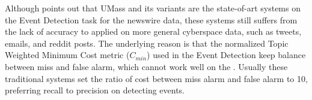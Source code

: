 \documentclass[conference,compsoc]{IEEEtran}
\begin{document}
Although \cite{Wurzer:2015wq} points out that UMass\cite{Allan:2000wu} and its variants\cite{Petrovic:2010uj}\cite{petrovic2012using}\cite{Wurzer:2015wq} are the state-of-art systems on the Event Detection task for the newswire data, these systems still suffers from the lack of accuracy to applied on more general cyberspace data, such as tweets, emails, and reddit posts. 
The underlying reason is that the normalized Topic Weighted Minimum Cost metric (\(C_{min}\)) used in the Event Detection keep balance between miss and false alarm, which cannot work well on the .
Usually these traditional systems set the ratio of cost between miss alarm and false alarm to 10, preferring recall to precision on detecting events.



\end{document}
